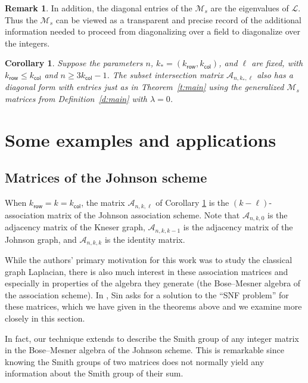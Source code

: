 \documentclass[11pt]{article}
\newtheorem{corollary}[theo]{Corollary}
\theoremstyle{definition}
\newtheorem{remark}[theo]{Remark}
\numberwithin{equation}{section}
\numberwithin{equation}{section}
\renewcommand{\L}{\mathcal{L}}
\newcommand{\M}{\mathcal{M}}
\newcommand{\A}{\mathcal{A}}
\newcommand{\kr}{{k}_{\mathsf{row}}}
\newcommand{\kc}{{k}_{\mathsf{col}}}
\newcommand{\kk}{{k}_{\mathsf{*}}}
\begin{document}
\begin{remark}
In addition, the diagonal entries of the $\M_s$ are the eigenvalues of $\L$.  Thus the $\M_s$ can be viewed as a transparent and precise record of the additional information needed to proceed from diagonalizing over a field to diagonalize over the integers.
\end{remark}

\begin{corollary}\label{c:main}
Suppose the parameters $n$, $\kk = (\kr,\kc)$, and $\ell$ are fixed, with $\kr \leq \kc$ and $n \geq 3\kc-1$.
The subset intersection matrix $\A_{n, \kk, \ell}$ also has a diagonal form with entries just as in Theorem~\ref{t:main} using the generalized $\M_s$ matrices from Definition~\ref{d:main} with $\lambda = 0$.
\end{corollary}



\section{Some examples and applications}\label{s:examples}


\subsection{Matrices of the Johnson scheme}
When $\kr = k = \kc$, the matrix $\A_{n, k, \ell}$ of Corollary \ref{c:main} is the $(k-\ell)$-association matrix of the Johnson association scheme. Note that $\A_{n,k,0}$ is the adjacency matrix of the Kneser graph, $\A_{n,k, k-1}$ is the adjacency matrix of the Johnson graph, and $\A_{n,k,k}$ is the identity matrix. 

While the authors' primary motivation for this work was to study the classical graph Laplacian, there is also much interest in these association matrices and especially in properties of the algebra they generate (the Bose--Mesner algebra of the association scheme).  In \cite[Problem 3.7]{snf-inc}, Sin asks for a solution to the ``SNF problem'' for these matrices, which we have given in the theorems above and we examine more closely in this section.  

In fact, our technique extends to describe the Smith group of any integer matrix in the Bose--Mesner algebra of the Johnson scheme.  This is remarkable since knowing the Smith groups of two matrices does not normally yield any information about the Smith group of their sum.  
\end{document}
